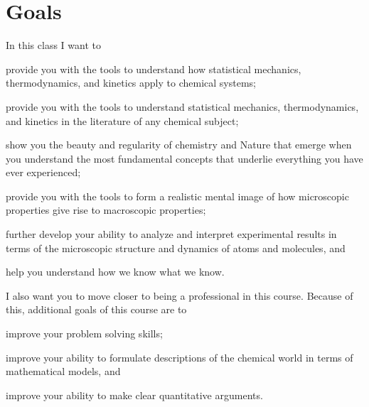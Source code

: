 \documentclass[letterpaper,oneside,onecolumn,11pt,article]{memoir}
\begin{document}
\section{Goals}
In this class I want to
\begin{inparaenum}
\item provide you with the tools to understand how statistical mechanics, thermodynamics, and kinetics apply to chemical systems;
\item provide you with the tools to understand statistical mechanics, thermodynamics, and kinetics in the literature of any chemical subject;
\item show you the beauty and regularity of chemistry and Nature that emerge when you understand the most fundamental concepts that underlie everything you have ever experienced;
\item provide you with the tools to form a realistic mental image of how microscopic properties give rise to macroscopic properties;
\item further develop your ability to analyze and interpret experimental results in terms of the microscopic structure and dynamics of atoms and molecules, and 
\item help you understand how we know what we know.
\end{inparaenum}

I also want you to move closer to being a professional in this course. Because of this, additional goals of this course are to
\begin{inparaenum}
\item improve your problem solving skills;
\item improve your ability to formulate descriptions of the chemical world in terms of mathematical models, and
\item improve your ability to make clear quantitative arguments.
\end{inparaenum}
%
%
\end{document}
